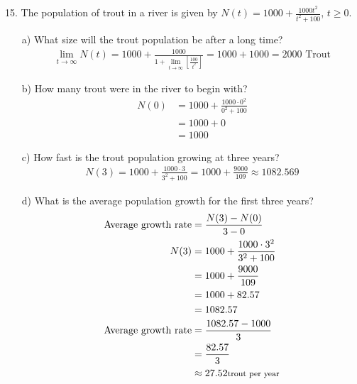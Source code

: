 \documentclass{article}
\newcommand{\smalltext}[1]{\text{\footnotesize #1}}
\begin{document}
15. The population of trout in a river is given by \( N(t) = 1000 + \frac{1000t^2}{t^2 + 100} \), \( t \geq 0 \).
\begin{enumerate}
    \item[a)] What size will the trout population be after a long time?
    \begin{align*}
\lim_{t \rightarrow \infty} N(t) = 1000 + \frac{1000}{1 + \lim_{t \rightarrow \infty} \left[\frac{100}{t^2}\right]} = 1000 + 1000 = 2000 \text{ Trout}
    \end{align*}
    \item[b)] How many trout were in the river to begin with?
    \begin{align*}
        N(0) &= 1000 + \frac{1000 \cdot 0^2}{0^2 + 100} \\
             &= 1000 + 0 \\
             &= 1000
    \end{align*}
    \item[c)] How fast is the trout population growing at three years?
    \begin{align*}
       N(3)=1000+\frac{1000 \cdot 3}{3^2+100}=1000+\frac{9000}{109} \approx 1082.569
    \end{align*}
    \item[d)] What is the average population growth for the first three years?
    \begin{align*}
        \text{Average growth rate} &= \frac{N(3) - N(0)}{3 - 0} \\
        N(3) &= 1000 + \frac{1000 \cdot 3^2}{3^2 + 100} \\
             &= 1000 + \frac{9000}{109} \\
             &= 1000 + 82.57 \\
             &= 1082.57 \\
        \text{Average growth rate} &= \frac{1082.57 - 1000}{3} \\
                                   &= \frac{82.57}{3} \\
                                   &\approx 27.52 \smalltext{ trout per year}
    \end{align*}
\end{enumerate}
\end{document}
